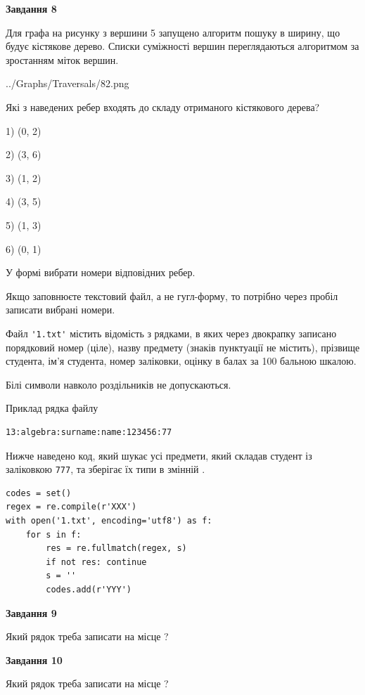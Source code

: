 \documentclass[12pt, ukrainian]{article}
\def\code#1{\Verb!#1!}
\begin{document}
{\begin {large}
{\begin {center}\textbf{Завдання 8}\end {center}}\par
Для графа на рисунку з вершини 5 запущено алгоритм пошуку в ширину, що будує кістякове дерево. Списки суміжності вершин переглядаються алгоритмом за зростанням міток вершин.\par
\begin{center}
	{../Graphs/Traversals/82.png}
\end{center}
\par Які з наведених ребер входять до складу отриманого кістякового дерева?\par
1) (0, 2)\par
2) (3, 6)\par
3) (1, 2)\par
4) (3, 5)\par
5) (1, 3)\par
6) (0, 1)\par
{\vskip 15pt} У формі вибрати номери відповідних ребер.


Якщо заповнюєте текстовий файл, а не гугл-форму, то потрібно через пробіл записа\-ти вибрані номери.\par
\newpage


Файл \code{'1.txt'} містить відомість з рядками, в яких через двокрапку записано поряд\-ковий номер (ціле), назву предмету (знаків пунктуації не містить), прізвище студента, ім'я студента, номер заліковки, оцінку в балах за 100 бальною шкалою.

Білі символи навколо роздільників не допускаються.

Приклад рядка файлу



\begin{verbatim}
13:algebra:surname:name:123456:77
\end{verbatim}


Нижче наведено код, який шукає усі предмети, який складав студент із заліковкою \code{777}, та зберігає їх типи в змінній .



\begin{verbatim}
codes = set()
regex = re.compile(r'XXX')
with open('1.txt', encoding='utf8') as f:
    for s in f:
        res = re.fullmatch(regex, s)
        if not res: continue
        s = ''
        codes.add(r'YYY')
\end{verbatim}


{\begin {center}\textbf{Завдання 9}\end {center}}\par
Який рядок треба записати на місце  ?\par
\vspace{5mm}


{\begin {center}\textbf{Завдання 10}\end {center}}\par
Який рядок треба записати на місце  ?\par


\newpage


\end {large}}
\end{document}
